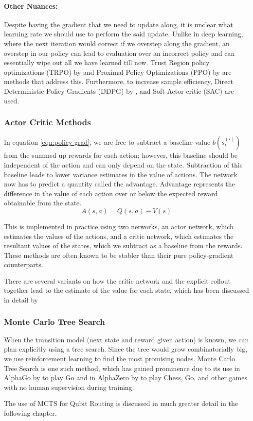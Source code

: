 \paragraph{Other Nuances:} Despite having the gradient that we need to update along, it is unclear what learning rate we should use to perform the said update. Unlike in deep learning, where the next iteration would correct if we overstep along the gradient, an overstep in our policy can lead to evaluation over an incorrect policy and can essentially wipe out all we have learned till now. Trust Region policy optimizations (TRPO) by \cite{trpo} and Proximal Policy Optimizations (PPO) by \cite{ppo} are methods that address this. Furthermore, to increase sample efficiency, Direct Deterministic Policy Gradients (DDPG) by \cite{ddpg}, and Soft Actor critic (SAC) \cite{sac} are used.

\subsubsection{Actor Critic Methods}

In equation \ref{eqn:policy-grad}, we are free to subtract a baseline value $b(s_t^{(i)})$ from the summed up rewards for each action; however, this baseline should be independent of the action and can only depend on the state. Subtraction of this baseline leads to lower variance estimates in the value of actions. The network now has to predict a quantity called the advantage. Advantage represents the difference in the value of each action over or below the expected reward obtainable from the state.
\begin{equation}\label{eqn:advantage}
    A(s, a) = Q(s, a) - V(s)
\end{equation}

This is implemented in practice using two networks, an actor network, which estimates the values of the actions, and a critic network, which estimates the resultant values of the states, which we subtract as a baseline from the rewards. These methods are often known to be stabler than their pure policy-gradient counterparts.

There are several variants on how the critic network and the explicit rollout together lead to the estimate of the value for each state, which has been discussed in detail by \cite{actor-critic-a2c, actor-critic-a3c, actor-critic-gae}

\subsubsection{Monte Carlo Tree Search}

When the transition model (next state and reward given action) is known, we can plan explicitly using a tree search. Since the tree would grow combinatorially big, we use reinforcement learning to find the most promising nodes. Monte Carlo Tree Search is one such method, which has gained prominence due to its use in AlphaGo by \cite{mcts-alphago} to play Go and in AlphaZero by \cite{mcts-alphazero} to play Chess, Go, and other games with no human supervision during training. 

The use of MCTS for Qubit Routing is discussed in much greater detail in the following chapter.